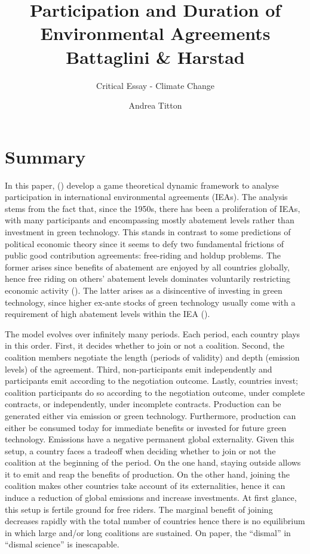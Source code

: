 \documentclass[american]{scrartcl}
\title{Participation and Duration of Environmental Agreements \\ Battaglini \& Harstad}
\subtitle{Critical Essay - Climate Change}
\author{Andrea Titton}
\newcommand{\citein}[1]{\citeauthor{#1} (\citeyear{#1})}
\begin{document}
\maketitle


\section{Summary}

In this paper, \citein{Battaglini2016} develop a game theoretical dynamic framework to analyse participation in international environmental agreements (IEAs). The analysis stems from the fact that, since the 1950s, there has been a proliferation of IEAs, with many participants and encompassing mostly abatement levels rather than investment in green technology. This stands in contrast to some predictions of political economic theory since it seems to defy two fundamental frictions of public good contribution agreements: free-riding and holdup problems. The former arises since benefits of abatement are enjoyed by all countries globally, hence free riding on others' abatement levels dominates voluntarily restricting economic activity (\cite{EspnolaArredondo2011}). The latter arises as a disincentive of investing in green technology, since higher ex-ante stocks of green technology usually come with a requirement of high abatement levels within the IEA (\cite{Harstad2012}).

The model evolves over infinitely many periods. Each period, each country plays in this order. First, it decides whether to join or not a coalition. Second, the coalition members negotiate the length (periods of validity) and depth (emission levels) of the agreement. Third, non-participants emit independently and participants emit according to the negotiation outcome. Lastly, countries invest; coalition participants do so according to the negotiation outcome, under complete contracts, or independently, under incomplete contracts. Production can be generated either via emission or green technology. Furthermore, production can either be consumed today for immediate benefits or invested for future green technology. Emissions have a negative permanent global externality. Given this setup, a country faces a tradeoff when deciding whether to join or not the coalition at the beginning of the period. On the one hand, staying outside allows it to emit and reap the benefits of production. On the other hand, joining the coalition makes other countries take account of its externalities, hence it can induce a reduction of global emissions and increase investments. At first glance, this setup is fertile ground for free riders. The marginal benefit of joining decreases rapidly with the total number of countries hence there is no equilibrium in which large and/or long coalitions are sustained. On paper, the ``dismal'' in ``dismal science'' is inescapable. %
\end{document}
